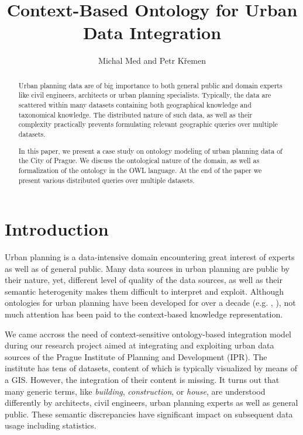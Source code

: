 \documentclass{lncs-template/llncs}
\begin{document}
\title{Context-Based Ontology for Urban Data Integration}

\author{Michal Med and Petr K\v{r}emen}

\maketitle

\begin{abstract}
Urban planning data are of big importance to both general public and domain experts like civil engineers, architects or urban planning specialists. Typically, the data are scattered within many datasets containing both geographical knowledge and taxonomical knowledge. The distributed nature of such data, as well as their complexity practically prevents formulating relevant geographic queries over multiple datasets. 

In this paper, we present a case study on ontology modeling of urban planning data of the City of Prague. We discuss the ontological nature of the domain, as well as formalization of the ontology in the OWL language. At the end of the paper we present various distributed queries over multiple datasets.
\end{abstract}

\section{Introduction}

Urban planning is a data-intensive domain encountering great interest of experts as well as of general public. Many data sources in urban planning are public by their nature, yet, different level of quality of the data sources, as well as their semantic heterogenity makes them difficult to interpret and exploit. Although ontologies for urban planning have been developed for over a decade (e.g. \cite{fonseca2000ontologies}, \cite{psyllidis2015ontology}), not much attention has been paid to the context-based knowledge representation. 

We came accross the need of context-sensitive ontology-based integration model during our research project aimed at integrating and exploiting urban data sources of the Prague Institute of Planning and Development (IPR). The institute has tens of datasets, content of which is typically visualized by means of a GIS. However, the integration of their content is missing. It turns out that many generic terms, like \emph{building}, \emph{construction}, or \emph{house}, are understood differently by architects, civil engineers, urban planning experts as well as general public. These semantic discrepancies have significant impact on subsequent data usage including statistics. 
\end{document}
